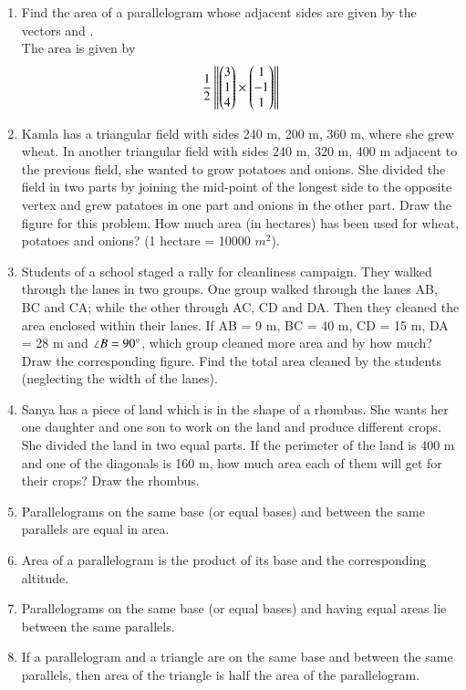 \begin{enumerate}[label=\arabic*.,ref=\thesubsection.\theenumi]
\item Find the area of a parallelogram whose adjacent sides are given by the vectors  and .
%
\\
\solution  The area is given by 
%
\begin{align}
\frac{1}{2}\left\lVert\begin{pmatrix}3\\1\\4\end{pmatrix} \times \begin{pmatrix}1\\-1\\1\end{pmatrix}\right\rVert
\end{align}
%
\item Kamla has a triangular field with sides 240 m, 200 m, 360 m, where she grew wheat. In another triangular field with sides 240 m, 320 m, 400 m adjacent to the previous field, she wanted to grow potatoes and onions. She divided the field in two parts by joining the mid-point of the longest side to the opposite vertex and grew patatoes in one part and onions in the other part. Draw the figure for this problem.  How much area (in hectares) has been used for wheat, potatoes and onions? (1 hectare = 10000 $m^2$).
\item Students of a school staged a rally for cleanliness campaign. They walked through the lanes in two groups. One group walked through the lanes AB, BC and CA; while the other through AC, CD and DA. Then they cleaned the area enclosed within their lanes. If AB = 9 m, BC = 40 m, CD = 15 m, DA = 28 m and $\angle B = 90\degree$, which group cleaned more area and by how much? Draw the corresponding figure.  Find the total area cleaned by the students (neglecting the width of the lanes). 
%
\item Sanya has a piece of land which is in the shape of a rhombus. She wants her one daughter and one son to work on the land and produce different crops. She divided the land in two equal parts. If the perimeter of the land is 400 m and one of the diagonals is 160 m, how much area each of them will get for their crops? Draw the rhombus.
%
\item Parallelograms on the same base (or equal bases) and between the same parallels are equal in area.
\item Area of a parallelogram is the product of its base and the corresponding altitude. 
\item Parallelograms on the same base (or equal bases) and having equal areas lie between the same parallels.
\item If a parallelogram and a triangle are on the same base and between the same parallels, then area of the triangle is half the area of the parallelogram.
\end{enumerate}
%
